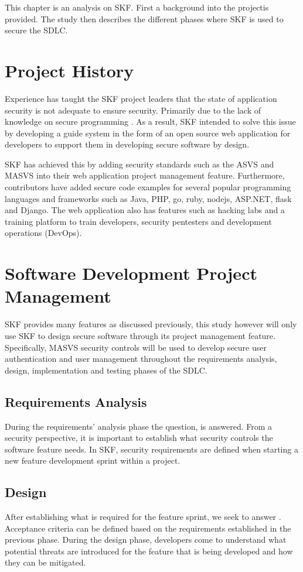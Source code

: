 This chapter is an analysis on SKF. First a background into the projectis provided. The study then describes the different phases where SKF is used to secure the SDLC.

\section{Project History}
Experience has taught the SKF project leaders that the state of application security is not adequate to ensure security. Primarily due to the lack of knowledge on secure programming \cite{skf_introduction}. As a result, SKF intended to solve this issue by developing a guide system in the form of an open source web application for developers to support them in developing secure software by design.

SKF has achieved this by adding security standards such as the ASVS and MASVS into their web application project management feature. Furthermore, contributors have added secure code examples for several popular programming languages and frameworks such as Java, PHP, go, ruby, nodejs, ASP.NET, flask and Django. The web application also has features such as hacking labs and a training platform to train developers, security pentesters and development operations (DevOps).

\section{Software Development Project Management}
SKF provides many features as discussed previously, this study however will only use SKF to design secure software through its project management feature. Specifically, MASVS security controls will be used to develop secure user authentication and user management throughout the requirements analysis, design, implementation and testing phases of the SDLC. 

\subsection{Requirements Analysis}
During the requirements' analysis phase the question,  is answered. From a security perspective, it is important to establish what security controls the software feature needs. In SKF, security requirements are defined when starting a new feature development sprint within a project.

\subsection{Design}
After establishing what is required for the feature sprint, we seek to answer . Acceptance criteria can be defined based on the requirements established in the previous phase. During the design phase, developers come to understand what potential threats are introduced for the feature that is being developed and how they can be mitigated.

